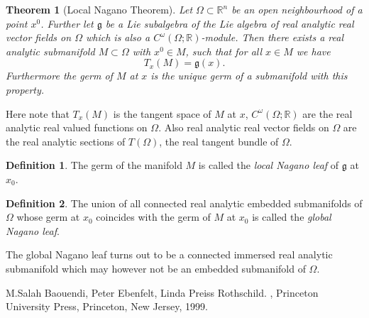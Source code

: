 \documentclass[12pt]{article}
\theoremstyle{theorem}
\newtheorem*{thm}{Theorem}
\theoremstyle{definition}
\newtheorem*{defn}{Definition}
\begin{document}
\begin{thm}[Local Nagano Theorem]
Let $\Omega \subset {\mathbb{R}}^n$ be an open neighbourhood of a point
$x^0$.  Further let $\mathfrak{g}$ be a Lie subalgebra of the Lie algebra of
real analytic real vector fields on $\Omega$ which is also a
$C^\omega(\Omega;{\mathbb{R}})$-module.  Then there exists a real analytic
submanifold $M \subset \Omega$ with $x^0 \in M$, such that for all $x \in M$
we have
\begin{equation*}
T_x(M) = \mathfrak{g}(x) .
\end{equation*}
Furthermore the germ of $M$ at $x$ is the unique germ of a submanifold with
this property.
\end{thm}

Here note that $T_x(M)$ is the tangent space of $M$ at $x$,
$C^\omega(\Omega;{\mathbb{R}})$ are the real analytic real valued functions
on $\Omega$.  Also real analytic real vector fields on $\Omega$ are the
real analytic sections of $T(\Omega)$, the real tangent bundle of $\Omega$.

\begin{defn}
The germ of the manifold $M$ is called the {\em local Nagano leaf} of 
$\mathfrak{g}$ at $x_0$.
\end{defn}

\begin{defn}
The union of all connected real analytic embedded submanifolds of $\Omega$ whose
germ at $x_0$ coincides with the germ of $M$ at $x_0$ is called the
{\em global Nagano leaf}. 
\end{defn}

The global Nagano leaf turns out to be a connected immersed real analytic submanifold which may however not be an embedded submanifold of $\Omega$.

\begin{thebibliography}{9}
M.\@ Salah Baouendi,
Peter Ebenfelt,
Linda Preiss Rothschild.
{\em {}},
Princeton University Press,
Princeton, New Jersey, 1999.
\end{thebibliography}
\end{document}
